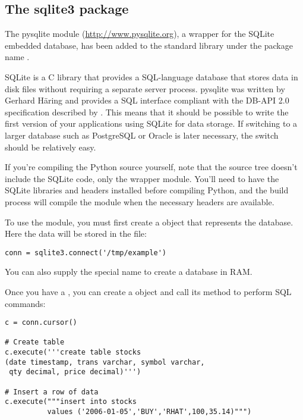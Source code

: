 \documentclass{howto}
\begin{document}
\subsection{The sqlite3 package\label{module-sqlite}}

The pysqlite module (\url{http://www.pysqlite.org}), a wrapper for the
SQLite embedded database, has been added to the standard library under
the package name .  

SQLite is a C library that provides a SQL-language database that
stores data in disk files without requiring a separate server process.
pysqlite was written by Gerhard H\"aring and provides a SQL interface
compliant with the DB-API 2.0 specification described by
. This means that it should be possible to write the first
version of your applications using SQLite for data storage.  If
switching to a larger database such as PostgreSQL or Oracle is
later necessary, the switch should be relatively easy.

If you're compiling the Python source yourself, note that the source
tree doesn't include the SQLite code, only the wrapper module.
You'll need to have the SQLite libraries and headers installed before
compiling Python, and the build process will compile the module when
the necessary headers are available.

To use the module, you must first create a  object
that represents the database.  Here the data will be stored in the 
 file:

\begin{verbatim}
conn = sqlite3.connect('/tmp/example')
\end{verbatim}

You can also supply the special name  to create
a database in RAM.

Once you have a , you can create a  
object and call its  method to perform SQL commands:

\begin{verbatim}
c = conn.cursor()

# Create table
c.execute('''create table stocks
(date timestamp, trans varchar, symbol varchar,
 qty decimal, price decimal)''')

# Insert a row of data
c.execute("""insert into stocks
          values ('2006-01-05','BUY','RHAT',100,35.14)""")
\end{verbatim}    
\end{document}
